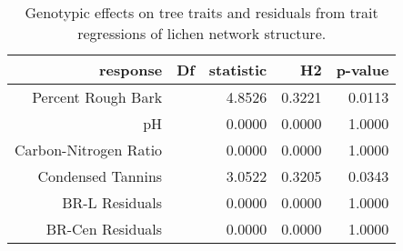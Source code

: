\begin{table}[ht]
\centering
\begin{tabular}{rrrrr}
  \hline
response & Df & statistic & H2 & p-value \\ 
  \hline
Percent Rough Bark &  & 4.8526 & 0.3221 & 0.0113 \\ 
  pH &  & 0.0000 & 0.0000 & 1.0000 \\ 
  Carbon-Nitrogen Ratio &  & 0.0000 & 0.0000 & 1.0000 \\ 
  Condensed Tannins &  & 3.0522 & 0.3205 & 0.0343 \\ 
  BR-L Residuals &  & 0.0000 & 0.0000 & 1.0000 \\ 
  BR-Cen Residuals &  & 0.0000 & 0.0000 & 1.0000 \\ 
   \hline
\end{tabular}
\caption{Genotypic effects on tree traits and residuals from trait regressions of lichen network structure.} 
\label{tab:h2_trait}
\end{table}
